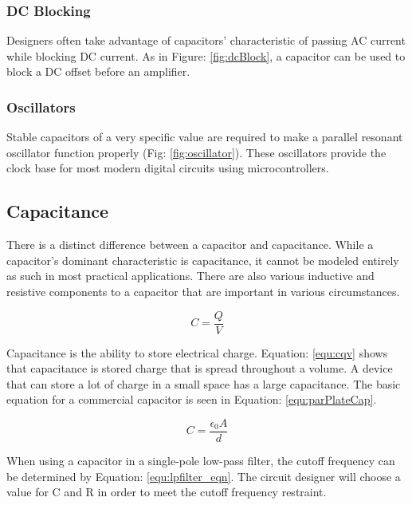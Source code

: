 \subsubsection{DC Blocking}

Designers often take advantage of capacitors' characteristic of passing AC current while blocking DC current. As in Figure: \ref{fig:dcBlock}, a capacitor can be used to block a DC offset before an amplifier.

\subsubsection{Oscillators}


Stable capacitors of a very specific value are required to make a parallel resonant oscillator function properly (Fig: \ref{fig:oscillator}). These oscillators provide the clock base for most modern digital circuits using microcontrollers.

\subsection{Capacitance}

There is a distinct difference between a capacitor and capacitance. While a capacitor's dominant characteristic is capacitance, it cannot be modeled entirely as such in most practical applications. There are also various inductive and resistive components to a capacitor that are important in various circumstances.

\begin{equation}
\label{equ:cqv}
C=\frac{Q}{V}
\end{equation}

Capacitance is the ability to store electrical charge. Equation: \eqref{equ:cqv} shows that capacitance is stored charge that is spread throughout a volume. A device that can store a lot of charge in a small space has a large capacitance. The basic equation for a commercial capacitor is seen in Equation: \eqref{equ:parPlateCap}.

\begin{equation}
\label{equ:parPlateCap}
C = \frac{\epsilon _0 A}{d}
\end{equation}

When using a capacitor in a single-pole low-pass filter, the cutoff frequency can be determined by Equation: \eqref{equ:lpfilter_eqn}. The circuit designer will choose a value for C and R in order to meet the cutoff frequency restraint.

